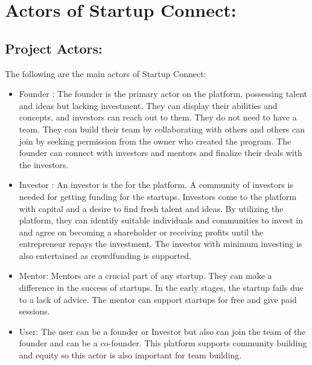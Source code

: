 \chapter{Actors of Startup Connect:} %
\label{Chapter3}
\section{Project Actors:}
The following are the main actors of Startup Connect:
\begin{itemize}
\item Founder : 
The founder is the primary actor on the platform, possessing talent and ideas but lacking investment. They can display their abilities and concepts, and investors can reach out to them. They do not need to have a team. They can build their team by collaborating with others and others can join by seeking permission from the owner who created the program. The founder can connect with investors and mentors and finalize their deals with the investors.
\item Investor : 
An investor is the   for the platform. A community of investors is needed for getting funding for the startups. Investors come to the platform with capital and a desire to find fresh talent and ideas. By utilizing the platform, they can identify suitable individuals and communities to invest in and agree on becoming a shareholder or receiving profits until the entrepreneur repays the investment. The investor with minimum investing is also entertained as crowdfunding is supported.
\item Mentor: 
Mentors are a crucial part of any startup. They can make a difference in the success of startups.
In the early stages, the startup fails due to a lack of advice. The mentor can support startups for free and give paid sessions.
\item User: 
The user can be a founder or Investor but also can join the team of the founder and can be a co-founder. This platform supports community building and equity so this actor is also important for team building.
\end{itemize}
